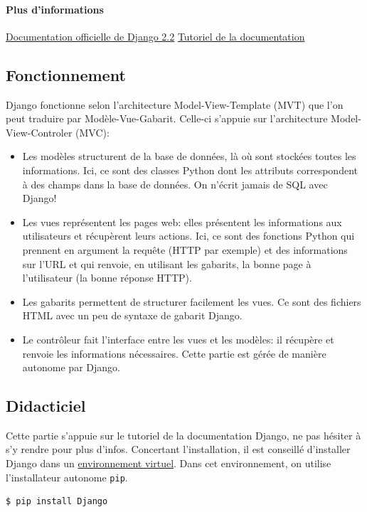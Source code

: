 \documentclass[a4paper, 10pt]{article}
\begin{document}
\paragraph{Plus d'informations} \href{https://docs.djangoproject.com/fr/2.2/}{Documentation officielle de Django 2.2} \href{https://docs.djangoproject.com/fr/2.2/intro/}{Tutoriel de la documentation}

\subsection{Fonctionnement}

Django fonctionne selon l'architecture Model-View-Template (MVT) que l'on peut traduire par Modèle-Vue-Gabarit. Celle-ci s’appuie sur l'architecture Model-View-Controler (MVC):
\begin{itemize}
    \item Les modèles structurent de la base de données, là où sont stockées toutes les informations. Ici, ce sont des classes Python dont les attributs correspondent à des champs dans la base de données. On n'écrit jamais de SQL avec Django!
    \item Les vues représentent les pages web: elles présentent les informations aux utilisateurs et récupèrent leurs actions. Ici, ce sont des fonctions Python qui prennent en argument la requête (HTTP par exemple) et des informations sur l’URL et qui renvoie, en utilisant les gabarits, la bonne page à l'utilisateur (la bonne réponse HTTP).
    \item Les gabarits permettent de structurer facilement les vues. Ce sont des fichiers HTML avec un peu de syntaxe de gabarit Django.
    \item Le contrôleur fait l'interface entre les vues et les modèles: il récupère et renvoie les informations nécessaires. Cette partie est gérée de manière autonome par Django.
\end{itemize}

\subsection{Didacticiel}
Cette partie s'appuie sur le tutoriel de la documentation Django, ne pas hésiter à s'y rendre pour plus d'infos. Concertant l'installation, il est conseillé d'installer Django dans un \hyperref[virtualenv]{environnement virtuel}. Dans cet environnement, on utilise l'installateur autonome \texttt{pip}.

\begin{verbatim}
$ pip install Django
\end{verbatim}
\end{document}
